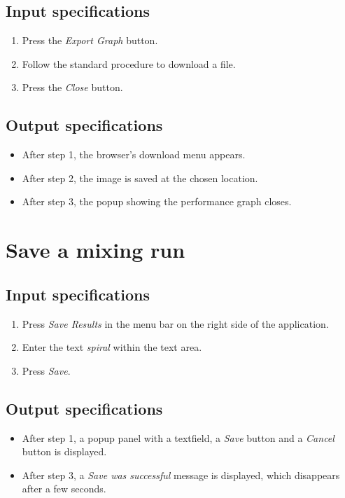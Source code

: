 \subsection*{Input specifications}
\begin{enumerate}
\item Press the \emph{Export Graph} button.
\item Follow the standard procedure to download a file.
\item Press the \emph{Close} button.
\end{enumerate}

\subsection*{Output specifications}
\begin{itemize}
\item After step 1, the browser's download menu appears.
\item After step 2, the image is saved at the chosen location.
\item After step 3, the popup showing the performance graph closes.
\end{itemize}

\section{Save a mixing run}

\subsection*{Input specifications}
\begin{enumerate}
\item Press \emph{Save Results} in the menu bar on the right side of the application.
\item Enter the text \emph{spiral} within the text area.
\item Press \emph{Save}.
\end{enumerate}

\subsection*{Output specifications}
\begin{itemize}
\item After step 1, a popup panel with a textfield, a \emph{Save} button and a \emph{Cancel} button is displayed.
\item After step 3, a \emph{Save was successful} message is displayed, which disappears after a few seconds.
\end{itemize}

